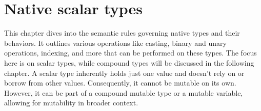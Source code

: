 \pagecolor{gray!10!white}
\chapter{Native scalar types}

This chapter dives into the semantic rules governing native types and their
behaviors. It outlines various operations like casting, binary and unary
operations, indexing, and more that can be performed on these types. The focus
here is on scalar types, while compound types will be discussed in the following
chapter. A scalar type inherently holds just one value and doesn't rely on or
borrow from other values. Consequently, it cannot be mutable on its own.
However, it can be part of a compound mutable type or a mutable variable,
allowing for mutability in broader context.

\begin{multicols*}{2}
  \minitoc%
  
\end{multicols*}

\nopagecolor{}
